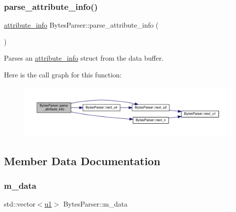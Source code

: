 \subsubsection{\texorpdfstring{parse\+\_\+attribute\+\_\+info()}{parse\_attribute\_info()}}
{\footnotesize\ttfamily \hyperlink{structattribute__info}{attribute\+\_\+info} Bytes\+Parser\+::parse\+\_\+attribute\+\_\+info (\begin{DoxyParamCaption}{ }\end{DoxyParamCaption})}



Parses an \hyperlink{structattribute__info}{attribute\+\_\+info} struct from the data buffer. 

Here is the call graph for this function\+:
\nopagebreak
\begin{figure}[H]
\begin{center}
\leavevmode
\includegraphics[width=350pt]{classBytesParser_ab7c84f75bd3dc2bcac74fd3ff4c6510a_cgraph}
\end{center}
\end{figure}


\subsection{Member Data Documentation}
\mbox{\label{classBytesParser_a89b64c815664cea2869895e24d3e1ed3}} 
\subsubsection{\texorpdfstring{m\+\_\+data}{m\_data}}
{\footnotesize\ttfamily std\+::vector$<$\hyperlink{types_8h_a162f47a77ee24f6f77cd8c82ccd40ab7}{u1}$>$ Bytes\+Parser\+::m\+\_\+data\hspace{0.3cm}{\ttfamily [private]}}

\mbox{\label{classBytesParser_a1116068a071fde3c2b634772c806af99}} 
